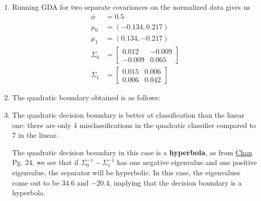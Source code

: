 \documentclass[12pt]{article}
\begin{document}
\begin{enumerate}[label=(\alph*)]
    \item Running GDA for two separate covariances on the normalized data gives us 
    \begin{align*}
        \phi &= 0.5 \\
        \mu_0 &= (-0.134,0.217) \\
        \mu_1 &= (0.134,-0.217) \\
        \Sigma_0 &= 
        \begin{bmatrix}
            0.012 & -0.009 \\
            -0.009 & 0.065
        \end{bmatrix} \\
        \Sigma_1 &= 
        \begin{bmatrix}
            0.015 & 0.006 \\
            0.006 & 0.042
        \end{bmatrix}
    \end{align*}

    \item The quadratic boundary obtained is as follows: 

    \begin{center}\end{center}

    \item The quadratic decision boundary is better at classification than the linear one: there are only 4 misclassifications in the quadratic classifier compared to 7 in the linear.

    The quadratic decision boundary in this case is a \textbf{hyperbola}, as from \href{https://engineering.purdue.edu/ChanGroup/ECE595/files/chapter2.pdf}{Chan} Pg. 24, we see that if $\Sigma_0^{-1} - \Sigma_1^{-1}$ has one negative eigenvalue and one positive eigenvalue, the separator will be hyperbolic. In this case, the eigenvalues come out to be $34.6$ and $-20.4$, implying that the decision boundary is a hyperbola.

\end{enumerate}
\end{document}
